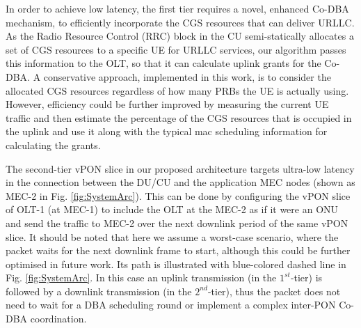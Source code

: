 \documentclass[a4paper, oneside, twocolumn, notitlepage, 10pt]{extarticle_ecoc}
\begin{document}
	In order to achieve low latency, the first tier requires a novel, enhanced Co-DBA mechanism, to efficiently incorporate the CGS resources that can deliver URLLC. As the Radio Resource Control (RRC) block in the CU semi-statically allocates a set of CGS resources to a specific UE for URLLC services, our algorithm passes this information to the OLT, so that it can calculate uplink grants for the Co-DBA. 
	A conservative approach, implemented in this work, is to consider the allocated CGS resources regardless of how many PRBs the UE is actually using. However, efficiency could be further improved by measuring the current UE traffic and then estimate the percentage of the CGS resources that is occupied in the uplink and use it along with the typical mac scheduling information for calculating the grants. %
	
	The second-tier vPON slice in our proposed architecture targets ultra-low latency in the connection between the DU/CU and the application MEC nodes (shown as MEC-2 in Fig. \ref{fig:SystemArc}).   %
	This can be done by configuring the vPON slice of OLT-1 (at MEC-1) to include the OLT at the MEC-2 as if it were an ONU and send the traffic to MEC-2 over the next downlink period of the same vPON slice. It should be noted that here we assume a worst-case scenario, where the packet waits for the next downlink frame to start, although this could be further optimised in future work. Its path is illustrated with blue-colored dashed line in Fig. \ref{fig:SystemArc}. In this case an uplink transmission (in  the $1^{st}$-tier) is followed by a downlink transmission (in the $2^{nd}$-tier), thus the packet does not need to wait for a DBA scheduling round or implement a complex inter-PON Co-DBA coordination.  %
	
\end{document}
